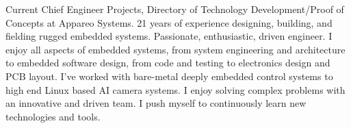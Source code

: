 

\begin{cvparagraph}

Current Chief Engineer Projects, Directory of Technology Development/Proof of Concepts at Appareo Systems. 21 years of experience designing, building, and fielding rugged embedded systems. Passionate, enthusiastic, driven engineer.
I enjoy all aspects of embedded systems, from system engineering and architecture to embedded software design, from code and testing to electronics design and PCB layout. I've worked with bare-metal deeply embedded control systems to high end Linux based AI camera systems. I enjoy solving complex problems with an innovative and driven team. I push myself to continuously learn new technologies and tools.
\end{cvparagraph}
